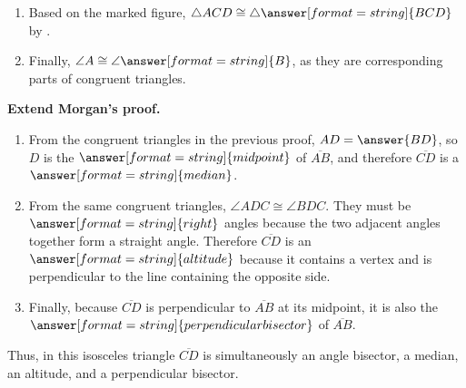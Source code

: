\documentclass[nooutcomes]{ximera}
\begin{document}
\begin{problem}
\begin{enumerate}
\item Based on the marked figure, $\triangle ACD\cong \triangle\answer[format=string]{BCD}$ by . 

\item Finally, $\angle A\cong \angle\answer[format=string]{B}$, as they are corresponding parts of congruent triangles. 
\end{enumerate}
\end{problem}


\begin{problem}
\textbf{Extend Morgan's proof.} 

\begin{enumerate}
\item From the congruent triangles in the previous proof, $AD= \answer{BD}$, so $D$ is the $\answer[format=string]{midpoint}$ of $\overline{AB}$, and 
therefore $\overline{CD}$ is a $\answer[format=string]{median}$.  
\item From the same congruent triangles, $\angle ADC\cong \angle BDC$.  They must be $\answer[format=string]{right}$ angles because the two adjacent angles together form a straight angle.  Therefore $\overline{CD}$ is an $\answer[format=string]{altitude}$ because it contains a vertex and is perpendicular to the line containing the opposite side.  
\item Finally, because $\overline{CD}$ is perpendicular to $\overline{AB}$ at its midpoint, it is also the $\answer[format=string]{perpendicular bisector}$ of 
$\overline{AB}$.  
\end{enumerate}
Thus, in this isosceles triangle $\overline{CD}$ is simultaneously an angle bisector, a median, an altitude, and a perpendicular bisector.
\end{problem}
\end{document}
